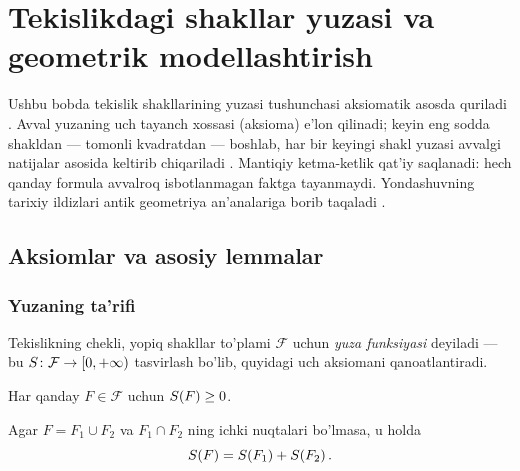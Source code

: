 
\chapter{Tekislikdagi shakllar yuzasi va geometrik modellashtirish}

Ushbu bobda tekislik shakllarining yuzasi tushunchasi aksiomatik asosda quriladi
\cite{Cohn1980, Rudin1976}.
Avval yuzaning uch tayanch xossasi (aksioma) e'lon qilinadi; keyin eng sodda shakldan
--- tomonli kvadratdan --- boshlab, har bir keyingi shakl yuzasi avvalgi natijalar
asosida keltirib chiqariladi \cite{Kiselev2006}.
Mantiqiy ketma-ketlik qat'iy saqlanadi: hech qanday formula avvalroq isbotlanmagan
faktga tayanmaydi.
Yondashuvning tarixiy ildizlari antik geometriya an'analariga borib taqaladi
\cite{Euclid_Heath1908, Heath1921}.

\section{Aksiomlar va asosiy lemmalar}
\label{sec:axioms}

\subsection*{Yuzaning ta'rifi}

\begin{tarif}
\label{def:area}
Tekislikning chekli, yopiq shakllar to'plami $\mathcal{F}$ uchun
\emph{yuza funksiyasi} deyiladi — bu $S\colon\mathcal{F}\to[0,+\infty)$
tasvirlash bo'lib, quyidagi uch aksiomani qanoatlantiradi.
\end{tarif}

\begin{aksioma}[Manfiymaslik]
\label{ax:nonneg}
Har qanday $F\in\mathcal{F}$ uchun $S\!\left(F\right)\ge 0$.
\end{aksioma}

\begin{aksioma}[Additivlik]
\label{ax:add}
Agar $F = F_1 \cup F_2$ va $F_1 \cap F_2$ ning ichki nuqtalari bo'lmasa,
u holda
\[
  S\!\left(F\right) = S\!\left(F_1\right) + S\!\left(F_2\right).
\]
\end{aksioma}

